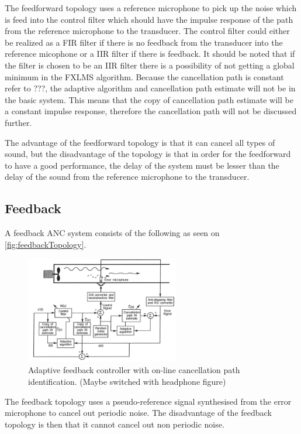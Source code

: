 The feedforward topology uses a reference microphone to pick up the noise which is feed into the control filter which should have the impulse response of the path from the reference microphone to the transducer. The control filter could either be realized as a FIR filter if there is no feedback from the transducer into the reference micophone or a IIR filter if there is feedback. It should be noted that if the filter is chosen to be an IIR filter there is a possibility of not getting a global minimum in the FXLMS algorithm. Because the cancellation path is constant refer to ???, the adaptive algorithm and cancellation path estimate will not be in the basic system. This means that the copy of cancellation path estimate will be a constant impulse response, therefore the cancellation path will not be discussed further. 

The advantage of the feedforward topology is that it can cancel all types of sound, but the disadvantage of the topology is that in order for the feedforward to have a good performance, the delay of the system must be lesser than the delay of the sound from the reference microphone to the transducer.    




\subsection*{Feedback}
A feedback ANC system consists of the following as seen on \autoref{fig:feedbackTopology}.
\begin{figure}[H]
	\centering
	\includegraphics[width=0.6\textwidth]{figures/BasicSystem/feedback}
	\caption{Adaptive feedback controller with on-line cancellation path identification. (Maybe switched with headphone figure)}
	\label{fig:feedbackTopology}
\end{figure}

The feedback topology uses a pseudo-reference signal synthesised from the error microphone to cancel out periodic noise. The disadvantage of the feedback topology is then that it cannot cancel out non periodic noise.    




